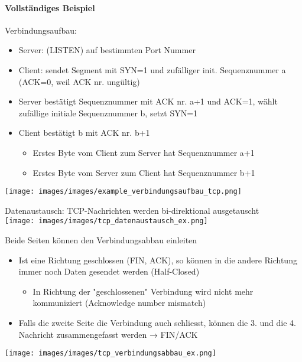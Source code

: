 \paragraph*{Vollständiges Beispiel}

\begin{example}
    Verbindungsaufbau:
    \begin{itemize}
        \item Server: (LISTEN) auf bestimmten Port Nummer
        \item Client: sendet Segment mit SYN=1 und zufälliger init. Sequenznummer a (ACK=0, weil ACK nr. ungültig)
        \item Server bestätigt Sequenznummer mit ACK nr. a+1 und ACK=1, wählt zufällige initiale Sequenznummer b, setzt SYN=1
        \item Client bestätigt b mit ACK nr. b+1 
        \begin{itemize}
            \item Erstes Byte vom Client zum Server hat Sequenznummer a+1
            \item Erstes Byte vom Server zum Client hat Sequenznummer b+1
        \end{itemize}
    \end{itemize}
    \centering
        \texttt{[image: images/images/example\_verbindungsaufbau\_tcp.png]}
\end{example}

\begin{example}
    Datenaustausch: TCP-Nachrichten werden bi-direktional ausgetauscht\\
    \centering
    \texttt{[image: images/images/tcp\_datenaustausch\_ex.png]}
\end{example}

\begin{example}
    Beide Seiten können den Verbindungsabbau einleiten
    \begin{itemize}
        \item Ist eine Richtung geschlossen (FIN, ACK), so können in die andere Richtung immer noch Daten gesendet werden (Half-Closed)
        \begin{itemize}
            \item In Richtung der "geschlossenen" Verbindung wird nicht mehr kommuniziert (Acknowledge number mismatch)
        \end{itemize}
        \item Falls die zweite Seite die Verbindung auch schliesst, können die 3. und die 4. Nachricht zusammengefasst werden → FIN/ACK
    \end{itemize}
    \centering
        \texttt{[image: images/images/tcp\_verbindungsabbau\_ex.png]}
\end{example}


